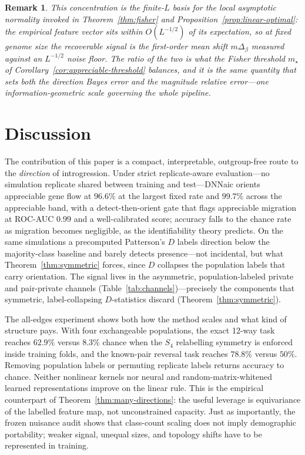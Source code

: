 \documentclass[11pt]{article}
\theoremstyle{plain}
\newtheorem{rem}[thm]{Remark}
\theoremstyle{definition}
\theoremstyle{remark}
\begin{document}
\begin{rem}
This concentration is the finite-$L$ basis for the local asymptotic normality invoked in
Theorem~\ref{thm:fisher} and Proposition~\ref{prop:linear-optimal}: the empirical feature vector
sits within $O(L^{-1/2})$ of its expectation, so at fixed genome size the recoverable signal is the
first-order mean shift $m\Delta_\beta$ measured against an $L^{-1/2}$ noise floor. The ratio of the
two is what the Fisher threshold $m_\star$ of Corollary~\ref{cor:appreciable-threshold} balances,
and it is the same quantity that sets both the direction Bayes error and the magnitude relative
error---one information-geometric scale governing the whole pipeline.
\end{rem}

\section{Discussion}
\label{sec:discussion}

The contribution of this paper is a compact, interpretable, outgroup-free route to the
\emph{direction} of introgression. Under strict replicate-aware evaluation---no simulation
replicate shared between training and test---DNNaic orients appreciable gene flow at $96.6\%$ at
the largest fixed rate and $99.7\%$ across the appreciable band, with a detect-then-orient gate that
flags appreciable migration at ROC-AUC $0.99$ and a well-calibrated score; accuracy falls to the
chance rate as migration becomes negligible, as the identifiability theory predicts. On the same
simulations a precomputed Patterson's $D$ labels direction below the majority-class baseline and
barely detects presence---not incidental, but what Theorem~\ref{thm:symmetric} forces, since $D$
collapses the population labels that carry orientation. The signal lives in the asymmetric,
population-labeled private and pair-private channels (Table~\ref{tab:channels})---precisely the
components that symmetric, label-collapsing $D$-statistics discard (Theorem~\ref{thm:symmetric}).

The all-edges experiment shows both how the method scales and what kind of structure pays. With
four exchangeable populations, the exact 12-way task reaches $62.9\%$ versus $8.3\%$ chance when
the $S_4$ relabelling symmetry is enforced inside training folds, and the known-pair reversal task
reaches $78.8\%$ versus $50\%$. Removing population labels or permuting replicate labels returns
accuracy to chance. Neither nonlinear kernels nor neural and random-matrix-whitened learned
representations improve on the linear rule. This is the empirical counterpart of
Theorem~\ref{thm:many-directions}: the useful leverage is equivariance of the labelled feature map,
not unconstrained capacity. Just as importantly, the frozen nuisance audit shows that class-count
scaling does not imply demographic portability; weaker signal, unequal sizes, and topology shifts
have to be represented in training.
\end{document}
